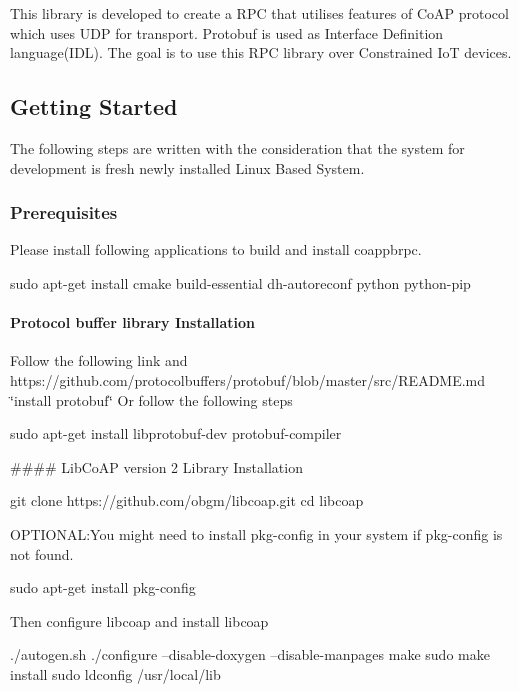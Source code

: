 This library is developed to create a R\+PC that utilises features of Co\+AP protocol which uses U\+DP for transport. Protobuf is used as Interface Definition language(\+I\+D\+L). The goal is to use this R\+PC library over Constrained IoT devices.

\subsection*{Getting Started}

The following steps are written with the consideration that the system for development is fresh newly installed Linux Based System.

\subsubsection*{Prerequisites}

Please install following applications to build and install coappbrpc. 
\begin{DoxyCode}
sudo apt-get install cmake build-essential dh-autoreconf python python-pip
\end{DoxyCode}
 \paragraph*{Protocol buffer library Installation}

Follow the following link and https\+://github.com/protocolbuffers/protobuf/blob/master/src/\+R\+E\+A\+D\+M\+E.\+md \char`\"{}install protobuf\char`\"{} Or follow the following steps 
\begin{DoxyCode}
sudo apt-get install libprotobuf-dev protobuf-compiler
\end{DoxyCode}


\#\#\#\# Lib\+Co\+AP version 2 Library Installation 
\begin{DoxyCode}
git clone https://github.com/obgm/libcoap.git
cd libcoap
\end{DoxyCode}
 O\+P\+T\+I\+O\+N\+AL\+:You might need to install pkg-\/config in your system if \textquotesingle{}pkg-\/config\textquotesingle{} is not found. 
\begin{DoxyCode}
sudo apt-get install pkg-config
\end{DoxyCode}
 Then configure libcoap and install libcoap 
\begin{DoxyCode}
./autogen.sh
./configure --disable-doxygen --disable-manpages
make
sudo make install
sudo ldconfig /usr/local/lib
\end{DoxyCode}


